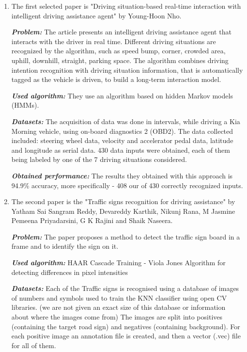 \documentclass[runningheads,a4paper,11pt]{report}
\begin{document}
\begin{enumerate}
  \item 
  The first selected paper is "Driving situation-based real-time interaction with intelligent driving assistance agent" \cite{drivingRealTimeInteraction} by Young-Hoon Nho. 
    
    \textbf{\emph{Problem:}} The article presents an intelligent driving assistance agent that interacts with the driver in real time. Different driving situations are recognized by the algorithm, such as speed bump, corner, crowded area, uphill, downhill, straight, parking space. The algorithm combines driving intention recognition with driving situation information, that is automatically tagged as the vehicle is driven, to build a long-term interaction model.
    
    \textbf{\emph{Used algorithm:}} They use an algorithm based on hidden Markov models (HMMs).
    
    \textbf{\emph{Datasets:}} The acquisition of data was done in intervals, while driving a Kia Morning vehicle, using on-board diagnostics 2 (OBD2). The data collected included: steering wheel data, velocity and accelerator pedal data, latitude and longitude as serial data. 430 data inputs were obtained, each of them being labeled by one of the 7 driving situations considered.

    \textbf{\emph{Obtained performance:}} The results they obtained with this approach is 94.9\% accuracy, more specifically - 408 our of 430 correctly recognized inputs.
    \newline
    
  \item 
  The second paper is the "Traffic signs recognition for driving assistance" \cite{Reddy_2017} by Yatham Sai Sangram Reddy, Devareddy Karthik, Nikunj Rana, M Jasmine Pemeena Priyadarsini, G K Rajini and Shaik Naseera. 
  
  \textbf{\emph{Problem:}} The paper proposes a method to detect the traffic sign board in a frame and to identify the sign on it. 
  
  \textbf{\emph{Used algorithm:}} HAAR Cascade Training - Viola Jones Algorithm for detecting differences in pixel intensities
  
  \textbf{\emph{Datasets:}} Each of the Traffic signs is recognised using a database of images of numbers and symbols used to train the KNN classifier using open CV libraries. (we are not given an exact size of this database or information about where the images come from) The images are split into positives (containing the target road sign) and negatives (containing background). For each positive image an annotation file is created, and then a vector (.vec) file for all of them.
  

\end{enumerate}
\end{document}
